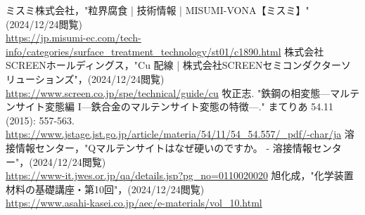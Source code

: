 \begin{thebibliography}{99}
     ミスミ株式会社，"粒界腐食 | 技術情報 | MISUMI-VONA【ミスミ】"(2024/12/24閲覧)\\
    \url{https://jp.misumi-ec.com/tech-info/categories/surface_treatment_technology/st01/c1890.html}
     株式会社SCREENホールディングス，"Cu 配線 | 株式会社SCREENセミコンダクターソリューションズ"，(2024/12/24閲覧)\\
    \url{https://www.screen.co.jp/spe/technical/guide/cu}
     牧正志. "鉄鋼の相変態—マルテンサイト変態編 I—鉄合金のマルテンサイト変態の特徴—." まてりあ 54.11 (2015): 557-563.\\
    \url{https://www.jstage.jst.go.jp/article/materia/54/11/54_54.557/_pdf/-char/ja}
     溶接情報センター，"Qマルテンサイトはなぜ硬いのですか。 - 溶接情報センター"，(2024/12/24閲覧)\\
    \url{https://www-it.jwes.or.jp/qa/details.jsp?pg_no=0110020020}
     旭化成，"化学装置材料の基礎講座・第10回"，(2024/12/24閲覧)\\
    \url{https://www.asahi-kasei.co.jp/aec/e-materials/vol_10.html}
    
\end{thebibliography}
